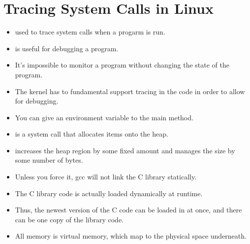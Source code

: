 \documentclass[]{article}
\begin{document}
\section{Tracing System Calls in Linux}
\begin{itemize}
\item {} used to trace system calls when a progarm is run.
\item {} is useful for debugging a program.
\item It's impossible to monitor a program without changing the state of the
program.
\item The kernel has to fundamental support tracing in the code in order to
allow for debugging.
\item You can give an environment variable to the main method.
\item {} is a system call that allocates items onto the heap.
\item {} increases the heap region by some fixed amount and manages
the size by some number of bytes.
\item Unless you force it, gcc will not link the C library statically.
\item The C library code is actually loaded dynamically at runtime.
\item Thus, the newest version of the C code can be loaded in at once, and there
can be one copy of the library code.
\item All memory is virtual memory, which map to the physical space underneath.
\end{itemize}
\end{document}

